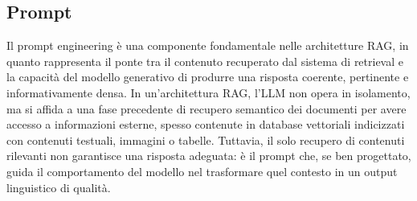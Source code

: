 \subsection{Prompt}

Il prompt engineering è una componente fondamentale nelle architetture RAG, in quanto rappresenta il ponte tra il contenuto recuperato dal sistema di retrieval e la capacità del modello generativo di produrre una risposta coerente, pertinente e informativamente densa. In un’architettura RAG, l'LLM non opera in isolamento, ma si affida a una fase precedente di recupero semantico dei documenti per avere accesso a informazioni esterne, spesso contenute in database vettoriali indicizzati con contenuti testuali, immagini o tabelle. Tuttavia, il solo recupero di contenuti rilevanti non garantisce una risposta adeguata: è il prompt che, se ben progettato, guida il comportamento del modello nel trasformare quel contesto in un output linguistico di qualità.

